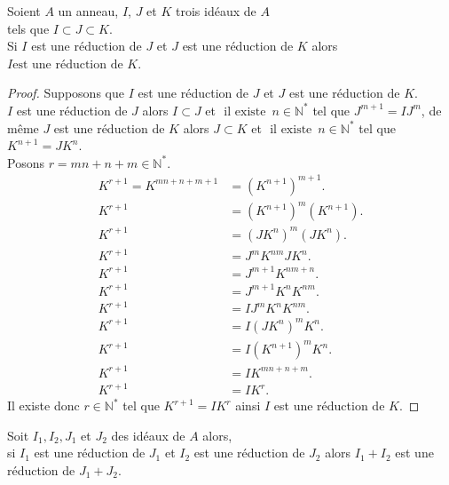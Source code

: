 \begin{maproposition}
	Soient $A$ un anneau, $I$, $J$ et $K$ trois id\'eaux de $A$ \\ tels que 
	$I \subset J \subset K $.\\ Si $I$ est une réduction de $J$ et $J$ est une réduction de $K$ alors $ I \text{est une réduction de }  K $.
\end{maproposition}
\begin{proof}
	Supposons que $I$ est une réduction de $J$ et $J$ est une réduction de $K$.\\
	$I$ est une réduction de $J$ alors $I \subset J$ et $\text{ il existe } \, n\in \mathbb{N}^{*}$ tel que $J^{m+1} = IJ^{m}$, de même $J$ est une réduction de $K$ alors $J \subset K$ et $\text{ il existe } \, n\in \mathbb{N}^{*}$ tel que $K^{n+1} = JK^{n}$.\\
	Posons $r = mn+n+m \in \mathbb{N}^{*}$.
	\begin{align*}
		K^{r+1} = K^{mn+n+m+1}& = (K^{n+1})^{m+1}.\\
		K^{r+1} & = (K^{n+1})^{m}(K^{n+1}).\\
		K^{r+1} & = (JK^{n})^{m}(JK^{n}).\\
		K^{r+1} & = J^{m}K^{nm}JK^{n}.\\
		K^{r+1} & = J^{m+1}K^{nm+n}.\\
		K^{r+1} & = J^{m+1}K^{n}K^{nm}.\\
		K^{r+1} & = IJ^{m}K^{n}K^{nm}.\\
		K^{r+1} & = I(JK^{n})^{m}K^{n}.\\
		K^{r+1} & = I(K^{n+1})^{m}K^{n}.\\
		K^{r+1} & = IK^{mn+n+m}.\\
		K^{r+1} & = IK^r.          
	\end{align*}
	Il existe donc $r\in \mathbb{N}^{*}$ tel que $K^{r+1} = IK^{r}$ ainsi $I$ est une réduction de $K$.
\end{proof}
\begin{monlemme}
	Soit $I_1, I_2, J_1$ et $J_2$ des idéaux de $A$ alors, \\ si $I_1$ est  une réduction de $J_1$ et $I_2$ est une réduction de $J_2$ alors $I_1+I_2$ est une réduction de $J_1+J_2$.
\end{monlemme}
